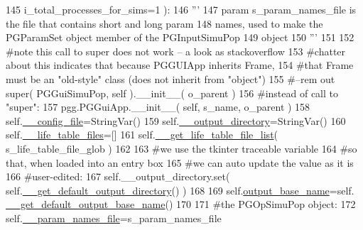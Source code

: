 \begin{DoxyCode}
145                             i\_total\_processes\_for\_sims=1 ):
146         \textcolor{stringliteral}{'''}
147 \textcolor{stringliteral}{        param s\_param\_names\_file is the file that contains short and long param}
148 \textcolor{stringliteral}{        names, used to make the PGParamSet object  member of the PGInputSimuPop }
149 \textcolor{stringliteral}{        object}
150 \textcolor{stringliteral}{        '''}
151 
152         \textcolor{comment}{#note this call to super does not work -- a look as stackoverflow}
153         \textcolor{comment}{#chatter about this indicates that because PGGUIApp inherits Frame,}
154         \textcolor{comment}{#that Frame must be an "old-style" class (does not inherit from "object")}
155         \textcolor{comment}{#--rem out super( PGGuiSimuPop, self ).\_\_init\_\_( o\_parent )}
156         \textcolor{comment}{#instead of call to "super":}
157         pgg.PGGuiApp.\_\_init\_\_( self, s\_name, o\_parent )
158         self.\hyperlink{classnegui_1_1pgguisimupop__experimental_1_1PGGuiSimuPop_abed2dc85d6d435a118768e1d909028f1}{\_\_config\_file}=StringVar()
159         self.\hyperlink{classnegui_1_1pgguisimupop__experimental_1_1PGGuiSimuPop_a1c57d01f1d698f728d48d0822464df37}{\_\_output\_directory}=StringVar()
160         self.\hyperlink{classnegui_1_1pgguisimupop__experimental_1_1PGGuiSimuPop_a3effbf25e458eea6cedea3d2e5adc832}{\_\_life\_table\_files}=[]
161         self.\hyperlink{classnegui_1_1pgguisimupop__experimental_1_1PGGuiSimuPop_aafbfda43c1a338891389eb8ed153c80a}{\_\_get\_life\_table\_file\_list}( s\_life\_table\_file\_glob )
162 
163         \textcolor{comment}{#we use the tkinter traceable variable}
164         \textcolor{comment}{#so that, when loaded into an entry box}
165         \textcolor{comment}{#we can auto update the value as it is }
166         \textcolor{comment}{#user-edited:}
167         self.\_\_output\_directory.set( self.\hyperlink{classnegui_1_1pgguisimupop__experimental_1_1PGGuiSimuPop_aca72c3133779c1c72443eac577c9df93}{\_\_get\_default\_output\_directory}() )
168 
169         self.\hyperlink{classnegui_1_1pgguisimupop__experimental_1_1PGGuiSimuPop_adfb7ba6ed1fd22ce052e5dec4143d9fa}{output\_base\_name}=self.
      \hyperlink{classnegui_1_1pgguisimupop__experimental_1_1PGGuiSimuPop_a253857bc0a1f5226fa994fbff7c87e16}{\_\_get\_default\_output\_base\_name}() 
170 
171         \textcolor{comment}{#the PGOpSimuPop object:}
172         self.\hyperlink{classnegui_1_1pgguisimupop__experimental_1_1PGGuiSimuPop_ab5e887cec4f1a43251e9c646b32f95c0}{\_\_param\_names\_file}=s\_param\_names\_file

\end{DoxyCode}
